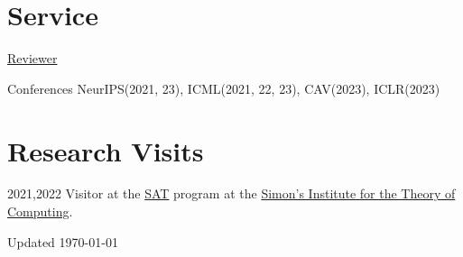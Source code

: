 \documentclass[12pt,letterpaper]{report}
\begin{document}
	
	
	\section*{Service}
	\underline{Reviewer }
	\begin{tablist}
		\item[Conferences] \tab NeurIPS(2021, 23), ICML(2021, 22, 23), CAV(2023), ICLR(2023)
	\end{tablist}
	
	\section*{Research Visits}
	\begin{tablist}
		\item[2021,2022]
		Visitor at the \href{https://simons.berkeley.edu/programs/sat2021}{SAT} program at the \href{https://simons.berkeley.edu/}{Simon's Institute for the Theory of Computing}.
	\end{tablist}
	
	\begin{center}
		\vfill
		Updated \monthyeardate\today
	\end{center}
	
\end{document}
